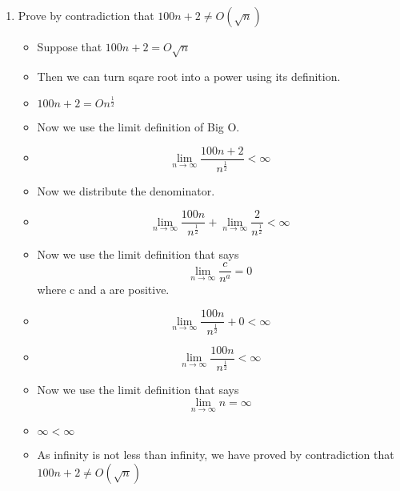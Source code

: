\documentclass{article}
\begin{document}
\begin{enumerate}
\item Prove by contradiction that $100n+2\neq O(\sqrt{n})$
  \begin{itemize}
  \item Suppose that $100n+2 = O \sqrt{n}$
  \item [] Then we can turn sqare root into a power using its definition.
  \item {\Large $100n+2 = O n^{\frac{1}{2}}$}
  \item [] Now we use the limit definition of Big O.
  \item {\Large $$\lim_{n \to \infty} \frac{100n+2}{n^{\frac{1}{2}}} < \infty$$}
  \item [] Now we distribute the denominator.
  \item {\Large $$\lim_{n \to \infty} \frac{100n}{n^{\frac{1}{2}}} + \lim_{n \to \infty} \frac{2}{n^{\frac{1}{2}}} < \infty$$}
  \item [] Now we use the limit definition that says {\Large $$\lim_{n \to \infty} \frac{c}{n^{a}} =0$$} where c and a are positive.
  \item {\Large $$\lim_{n \to \infty} \frac{100n}{n^{\frac{1}{2}}} + 0 < \infty$$}
  \item {\Large $$\lim_{n \to \infty} \frac{100n}{n^{\frac{1}{2}}} < \infty$$}
  \item [] Now we use the limit definition that says {\large $$\lim_{n \to \infty} n = \infty$$}
  \item $\infty < \infty$
  \item As infinity is not less than infinity, we have proved by contradiction that $100n+2 \neq O(\sqrt{n})$
  \end{itemize}
\end{enumerate}
\end{document}

